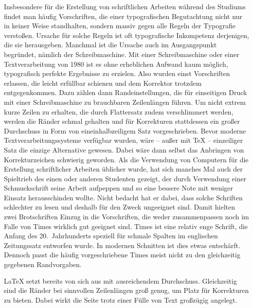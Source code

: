 Insbesondere für die Erstellung von schriftlichen Arbeiten während des
Studiums findet man häufig Vorschriften, die einer typografischen Begutachtung nicht nur in
keiner Weise standhalten, sondern massiv gegen alle Regeln der Typografie
verstoßen. Ursache für solche Regeln ist oft typografische Inkompetenz
derjenigen, die sie herausgeben. Manchmal ist die Ursache auch im
Ausgangspunkt begründet, nämlich der Schreibmaschine. Mit einer
Schreibmaschine oder einer Textverarbeitung von 1980 ist es
ohne
erheblichen Aufwand kaum möglich, typografisch perfekte Ergebnisse zu
erzielen. Also wurden einst Vorschriften erlassen, die leicht erfüllbar
schienen und dem Korrektor trotzdem entgegenkommen. Dazu zählen dann
Randeinstellungen, die für einseitigen Druck mit einer Schreibmaschine zu
brauchbaren Zeilenlängen führen. Um nicht extrem kurze Zeilen zu erhalten, die
durch Flattersatz zudem verschlimmert werden, werden die Ränder schmal
gehalten und für Korrekturen stattdessen ein großer Durchschuss in Form von
eineinhalbzeiligem Satz vorgeschrieben.  Bevor moderne
Textverarbeitungssysteme verfügbar wurden, wäre -- außer mit {\TeX} --
einzeiliger Satz die einzige Alternative gewesen. Dabei wäre dann selbst das
Anbringen von Korrekturzeichen schwierig geworden. Als die Verwendung von
Computern für die Erstellung schriftlicher Arbeiten üblicher wurde, hat sich
manches Mal auch der Spieltrieb des einen oder anderen Studenten gezeigt, der
durch Verwendung einer Schmuckschrift seine Arbeit aufpeppen und so eine
bessere Note mit weniger Einsatz herausschinden wollte.  Nicht bedacht hat er
dabei, dass solche Schriften schlechter zu lesen und deshalb für den Zweck
ungeeignet sind. Damit hielten zwei Brotschriften Einzug in die Vorschriften,
die weder zusammenpassen noch im Falle von Times wirklich gut geeignet
sind. Times ist eine relativ enge Schrift, die Anfang des 20.~Jahrhunderts
speziell für schmale Spalten im englischen Zeitungssatz entworfen wurde. In
modernen Schnitten ist dies etwas entschärft. Dennoch passt die häufig
vorgeschriebene Times meist nicht zu den gleichzeitig gegebenen Randvorgaben.

{\LaTeX} setzt bereits von sich aus mit ausreichendem Durchschuss.
Gleichzeitig sind die Ränder bei sinnvollen Zeilenlängen groß genug, um Platz
für Korrekturen zu bieten. Dabei wirkt die Seite trotz einer Fülle von Text
großzügig angelegt.

